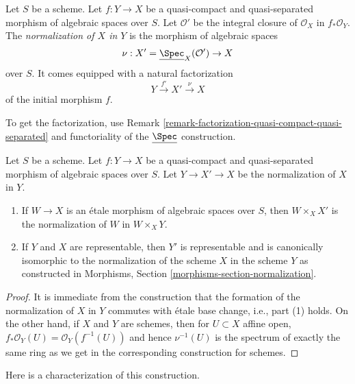 \begin{definition}
\label{definition-normalization-X-in-Y}
Let $S$ be a scheme. Let $f : Y \to X$ be a quasi-compact and quasi-separated
morphism of algebraic spaces over $S$. Let $\mathcal{O}'$ be the integral
closure of $\mathcal{O}_X$ in $f_*\mathcal{O}_Y$. The {\it normalization of
$X$ in $Y$} is the morphism of algebraic spaces
$$
\nu : X' = \underline{\Spec}_X(\mathcal{O}') \to X
$$
over $S$. It comes equipped with a natural factorization
$$
Y \xrightarrow{f'} X' \xrightarrow{\nu} X
$$
of the initial morphism $f$.
\end{definition}

\noindent
To get the factorization, use Remark
\ref{remark-factorization-quasi-compact-quasi-separated}
and functoriality of the $\underline{\Spec}$ construction.

\begin{lemma}
\label{lemma-properties-normalization}
Let $S$ be a scheme. Let $f : Y \to X$ be a quasi-compact and quasi-separated
morphism of algebraic spaces over $S$. Let $Y \to X' \to X$ be the
normalization of $X$ in $Y$.
\begin{enumerate}
\item If $W \to X$ is an \'etale morphism of algebraic spaces over $S$,
then $W \times_X X'$ is the normalization of $W$ in $W \times_X Y$.
\item If $Y$ and $X$ are representable, then $Y'$ is representable
and is canonically isomorphic to the normalization of the scheme $X$
in the scheme $Y$ as constructed in
Morphisms, Section \ref{morphisms-section-normalization}.
\end{enumerate}
\end{lemma}

\begin{proof}
It is immediate from the construction that the formation
of the normalization of $X$ in $Y$ commutes with \'etale
base change, i.e., part (1) holds. On the other hand, if
$X$ and $Y$ are schemes, then for $U \subset X$ affine open,
$f_*\mathcal{O}_Y(U) = \mathcal{O}_Y(f^{-1}(U))$ and hence
$\nu^{-1}(U)$ is the spectrum of exactly the same ring as
we get in the corresponding construction for schemes.
\end{proof}

\noindent
Here is a characterization of this construction.

